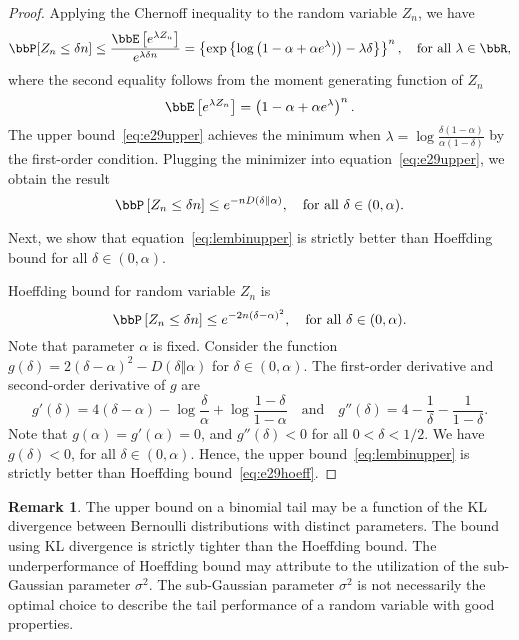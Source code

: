 \documentclass[11pt]{article}
\newcommand{\of}[1]{\left(#1\right)}
\newcommand{\off}[1]{\left[#1\right]}
\newcommand{\offf}[1]{\left\{#1\right\}}
\theoremstyle{plain}
\theoremstyle{definition}
\newtheorem{rmk}{Remark}
\begin{document}
\begin{proof}
    Applying the Chernoff inequality to the random variable $Z_n$, we have
    \begin{equation}\label{eq:e29upper}
    	\bbP[Z_n \leq \delta n] \leq \frac{\bbE\off{e^{\lambda Z_n}}}{e^{\lambda \delta n}} = \offf {\exp \offf{\log \of{1 - \alpha + \alpha e^{\lambda})}- \lambda \delta }}^n,\quad \text{for all } \lambda \in \bbR,
    \end{equation}
    where the second equality follows from the moment generating function of $Z_n$
    \[\bbE\off{e^{\lambda Z_n}} = \of{1 - \alpha + \alpha e^{\lambda}}^n. \]
    The upper bound~\eqref{eq:e29upper} achieves the minimum when $\lambda = \log {\frac{\delta(1-\alpha)}{\alpha(1 - \delta)}}$ by the first-order condition. Plugging the minimizer into equation~\eqref{eq:e29upper}, we obtain the result
    \[ \bbP\off{Z_n \leq \delta n}  \leq e^{-n D\of{\delta \Vert \alpha}}, \quad \text{for all }\delta \in (0,\alpha).  \]
    
    \vspace{0.2cm}
    Next, we show that equation~\eqref{eq:lembinupper} is strictly better than Hoeffding bound for all $\delta \in (0,\alpha)$.
    
    \vspace{0.2cm}
    Hoeffding bound for random variable $Z_n$ is 
    \begin{equation}\label{eq:e29hoeff}
    	\bbP\off{Z_n \leq \delta n} \leq e^{ {-2n(\delta - \alpha)^2}}, \quad \text{for all }\delta \in (0,\alpha).
    \end{equation}
    Note that parameter $\alpha$ is fixed. Consider the function $g(\delta) = 2(\delta - \alpha)^2 - D\of{\delta \Vert \alpha}$ for $\delta \in (0,\alpha)$. The first-order derivative and  second-order derivative of $g$ are
    \[ g'(\delta) = 4(\delta - \alpha) - \log \frac{\delta}{\alpha} + \log \frac{1-\delta}{1-\alpha} \quad \text{and} \quad g''(\delta) = 4 - \frac{1}{\delta} - \frac{1}{1-\delta}. \] 
    Note that $ g(\alpha) = g'(\alpha) = 0$, and $g''(\delta) < 0$ for all $0 < \delta < 1/2$. We have $g(\delta) < 0$, for all $\delta \in (0,\alpha)$. Hence, the upper bound~\eqref{eq:lembinupper} is strictly better than Hoeffding bound~\eqref{eq:e29hoeff}.
    
\end{proof}

\begin{rmk}
	The upper bound on a binomial tail may be a function of the KL divergence between Bernoulli distributions with distinct parameters. The bound using KL divergence is strictly tighter than the Hoeffding bound. The underperformance of Hoeffding bound may attribute to the utilization of the sub-Gaussian parameter $\sigma^2$. The sub-Gaussian parameter $\sigma^2$ is not necessarily the optimal choice to describe the tail performance of a random variable with good properties. 
\end{rmk}
\end{document}
